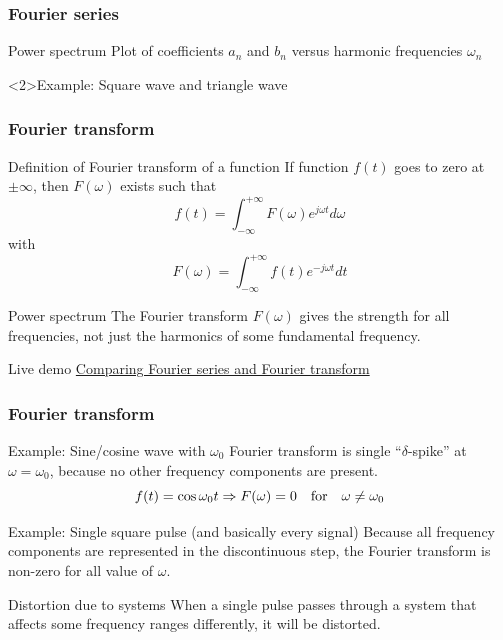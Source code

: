 \documentclass[beamer]{standalone}
\begin{document}
\begin{frame}[t]
 \frametitle{Fourier series}
 \begin{block}{Power spectrum}
  Plot of coefficients $a_n$ and $b_n$ versus harmonic frequencies $\omega_n$
 \end{block}
 \begin{block}<2>{Example: Square wave and triangle wave}
  \begin{center}
  \end{center}
 \end{block}
\end{frame}

\begin{frame}
 \frametitle{Fourier transform}
 \begin{block}{Definition of Fourier transform of a function}
  If function $f(t)$ goes to \alert{zero at $\pm \infty$}, then $F(\omega)$ exists such that
  \[ f(t) = \int^{+\infty}_{-\infty} F(\omega) e^{j \omega t} d\omega \]
  with
  \[ F(\omega) = \int^{+\infty}_{-\infty} f(t) e^{-j \omega t} dt \]
 \end{block}
 \begin{block}{Power spectrum}
  The Fourier transform $F(\omega)$ gives the strength \alert{for all frequencies}, not just the harmonics of some fundamental frequency.
 \end{block}
 \begin{block}{Live demo}
  \href{http://demonstrations.wolfram.com/ComparingFourierSeriesAndFourierTransform/}{Comparing Fourier series and Fourier transform}
 \end{block}
\end{frame}

\begin{frame}
 \frametitle{Fourier transform}
 \begin{block}{Example: Sine/cosine wave with $\omega_0$}
  Fourier transform is single ``$\delta$-spike'' at $\omega = \omega_0$, because no other frequency components are present.
  \[ f(t) = \cos\omega_0 t \Rightarrow F(\omega) = 0 \quad \hbox{for} \quad \omega \ne \omega_0 \]
 \end{block}
 \begin{block}{Example: Single square pulse (and basically every signal)}
  Because all frequency components are represented in the discontinuous step, the Fourier transform is non-zero for all value of $\omega$.
 \end{block}
 \begin{block}{Distortion due to systems}
  When a single pulse passes through a system that affects some frequency ranges differently, it will be distorted.
 \end{block}
\end{frame}
\end{document}
